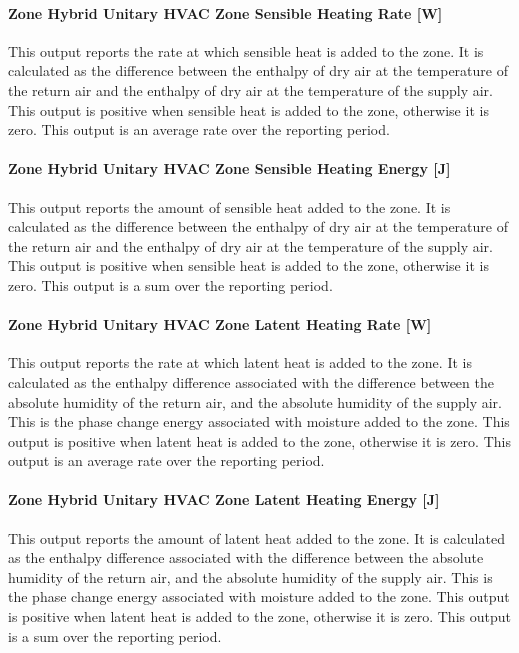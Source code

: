 \paragraph{Zone Hybrid Unitary HVAC Zone Sensible Heating Rate [W]}
This output reports the rate at which sensible heat is added to the zone.  It is calculated as the difference between the enthalpy of dry air at the temperature of the return air and the enthalpy of dry air at the temperature of the supply air. This output is positive when sensible heat is added to the zone, otherwise it is zero.  This output is an average rate over the reporting period.

\paragraph{Zone Hybrid Unitary HVAC Zone Sensible Heating Energy [J]}
This output reports the amount of sensible heat added to the zone. It is calculated as the difference between the enthalpy of dry air at the temperature of the return air and the enthalpy of dry air at the temperature of the supply air.  This output is positive when sensible heat is added to the zone, otherwise it is zero.  This output is a sum over the reporting period.

\paragraph{Zone Hybrid Unitary HVAC Zone Latent Heating Rate [W]}
This output reports the rate at which latent heat is added to the zone. It is calculated as the enthalpy difference associated with the difference between the absolute humidity of the return air, and the absolute humidity of the supply air. This is the phase change energy associated with moisture added to the zone. This output is positive when latent heat is added to the zone, otherwise it is zero.  This output is an average rate over the reporting period.

\paragraph{Zone Hybrid Unitary HVAC Zone Latent Heating Energy [J]}
This output reports the amount of latent heat added to the zone. It is calculated as the enthalpy difference associated with the difference between the absolute humidity of the return air, and the absolute humidity of the supply air. This is the phase change energy associated with moisture added to the zone. This output is positive when latent heat is added to the zone, otherwise it is zero.  This output is a sum over the reporting period.

